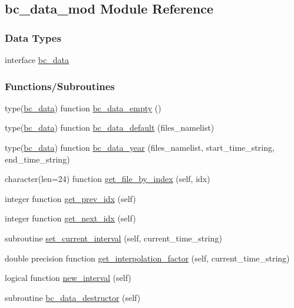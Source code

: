 \hypertarget{namespacebc__data__mod}{}\subsection{bc\+\_\+data\+\_\+mod Module Reference}
\label{namespacebc__data__mod}
\subsubsection*{Data Types}
\begin{DoxyCompactItemize}
\item 
interface \mbox{\hyperlink{structbc__data__mod_1_1bc__data}{bc\+\_\+data}}
\end{DoxyCompactItemize}
\subsubsection*{Functions/\+Subroutines}
\begin{DoxyCompactItemize}
\item 
type(\mbox{\hyperlink{structbc__data__mod_1_1bc__data}{bc\+\_\+data}}) function \mbox{\hyperlink{namespacebc__data__mod_a6066df330a73414534b7985dde660257}{bc\+\_\+data\+\_\+empty}} ()
\item 
type(\mbox{\hyperlink{structbc__data__mod_1_1bc__data}{bc\+\_\+data}}) function \mbox{\hyperlink{namespacebc__data__mod_a38373da4eb529dc3f79181ec9ec125dd}{bc\+\_\+data\+\_\+default}} (files\+\_\+namelist)
\item 
type(\mbox{\hyperlink{structbc__data__mod_1_1bc__data}{bc\+\_\+data}}) function \mbox{\hyperlink{namespacebc__data__mod_ae491b51c308e1f2d8077fbf42ab86b7d}{bc\+\_\+data\+\_\+year}} (files\+\_\+namelist, start\+\_\+time\+\_\+string, end\+\_\+time\+\_\+string)
\item 
character(len=24) function \mbox{\hyperlink{namespacebc__data__mod_a5d07785bb1d93602c589990b9cf45d11}{get\+\_\+file\+\_\+by\+\_\+index}} (self, idx)
\item 
integer function \mbox{\hyperlink{namespacebc__data__mod_a4680b62613a8c4a8a2b4322dae7499a1}{get\+\_\+prev\+\_\+idx}} (self)
\item 
integer function \mbox{\hyperlink{namespacebc__data__mod_a397f6b2d3644d73765de453b36af3d2a}{get\+\_\+next\+\_\+idx}} (self)
\item 
subroutine \mbox{\hyperlink{namespacebc__data__mod_a6876514f79a3238bb950413ab9e19af7}{set\+\_\+current\+\_\+interval}} (self, current\+\_\+time\+\_\+string)
\item 
double precision function \mbox{\hyperlink{namespacebc__data__mod_afffb637afa5dfeece5438e22b9466145}{get\+\_\+interpolation\+\_\+factor}} (self, current\+\_\+time\+\_\+string)
\item 
logical function \mbox{\hyperlink{namespacebc__data__mod_a5f135663819ff90c7e82aa3859ecf596}{new\+\_\+interval}} (self)
\item 
subroutine \mbox{\hyperlink{namespacebc__data__mod_a30c3d0aac53434a0095f542b67aad077}{bc\+\_\+data\+\_\+destructor}} (self)
\end{DoxyCompactItemize}



